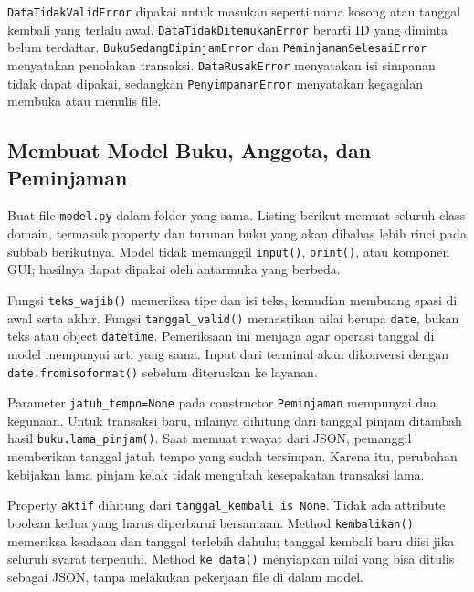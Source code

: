 \texttt{DataTidakValidError} dipakai untuk masukan seperti nama kosong atau tanggal kembali yang terlalu awal. \texttt{DataTidakDitemukanError} berarti ID yang diminta belum terdaftar. \texttt{BukuSedangDipinjamError} dan \texttt{PeminjamanSelesaiError} menyatakan penolakan transaksi. \texttt{DataRusakError} menyatakan isi simpanan tidak dapat dipakai, sedangkan \texttt{PenyimpananError} menyatakan kegagalan membuka atau menulis file.

\subsection{Membuat Model Buku, Anggota, dan Peminjaman}

Buat file \texttt{model.py} dalam folder yang sama. Listing berikut memuat seluruh class domain, termasuk property dan turunan buku yang akan dibahas lebih rinci pada subbab berikutnya. Model tidak memanggil \texttt{input()}, \texttt{print()}, atau komponen GUI; hasilnya dapat dipakai oleh antarmuka yang berbeda.

\begin{kode}
\end{kode}

Fungsi \texttt{teks\_wajib()} memeriksa tipe dan isi teks, kemudian membuang spasi di awal serta akhir. Fungsi \texttt{tanggal\_valid()} memastikan nilai berupa \texttt{date}, bukan teks atau object \texttt{datetime}. Pemeriksaan ini menjaga agar operasi tanggal di model mempunyai arti yang sama. Input dari terminal akan dikonversi dengan \texttt{date.fromisoformat()} sebelum diteruskan ke layanan.

Parameter \texttt{jatuh\_tempo=None} pada constructor \texttt{Peminjaman} mempunyai dua kegunaan. Untuk transaksi baru, nilainya dihitung dari tanggal pinjam ditambah hasil \texttt{buku.lama\_pinjam()}. Saat memuat riwayat dari JSON, pemanggil memberikan tanggal jatuh tempo yang sudah tersimpan. Karena itu, perubahan kebijakan lama pinjam kelak tidak mengubah kesepakatan transaksi lama.

Property \texttt{aktif} dihitung dari \texttt{tanggal\_kembali is None}. Tidak ada attribute boolean kedua yang harus diperbarui bersamaan. Method \texttt{kembalikan()} memeriksa keadaan dan tanggal terlebih dahulu; tanggal kembali baru diisi jika seluruh syarat terpenuhi. Method \texttt{ke\_data()} menyiapkan nilai yang bisa ditulis sebagai JSON, tanpa melakukan pekerjaan file di dalam model.

